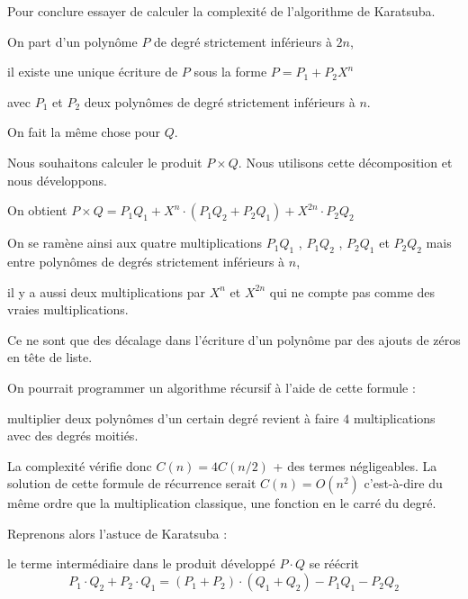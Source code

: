 Pour conclure essayer de calculer la complexité de l'algorithme de Karatsuba.

\diapo


On part d'un polynôme $P$ de degré strictement inférieurs à $2n$,

il existe une unique écriture de $P$ sous la forme $P = P_1 + P_2 X^n $

avec $P_1$ et $P_2$ deux polynômes de degré strictement inférieurs à $n$.

On fait la même chose pour $Q$.

\change

Nous souhaitons calculer le produit $P\times Q$. Nous utilisons cette décomposition  
et nous développons.

\change

On obtient $P\times Q= P_1 Q_1 + X^n \cdot (P_1 Q_2 + P_2 Q_1 ) + X^{2n} \cdot P_2 Q_2$

\change

On se ramène ainsi aux quatre multiplications $P_1 Q_1$ , $P_1 Q_2$ , $P_2 Q_1$ et $P_2 Q_2$ 
mais entre polynômes de degrés strictement inférieurs à $n$,


\change



il y a aussi deux multiplications par $X^n$ et $X^{2n}$ qui ne  compte pas comme des vraies multiplications.

Ce ne sont que des décalage dans l'écriture d'un polynôme par des ajouts de zéros en tête de liste.

\change

On pourrait programmer un algorithme récursif à l'aide de cette formule :

multiplier deux polynômes d'un certain degré revient à faire $4$ multiplications avec des degrés moitiés.

La complexité vérifie donc $C(n) = 4C(n/2)$ + des termes négligeables. La solution de cette formule de récurrence
serait  $C(n) = O(n^2)$ c'est-à-dire du même ordre que la multiplication classique, une fonction en 
le carré du degré.
 
 

\change

Reprenons alors l'astuce de Karatsuba :

\change

le terme intermédiaire dans le produit développé $P \cdot Q$ se réécrit 
$$P_1 \cdot Q_2 + P_2 \cdot Q_1 = (P_1 + P_2 ) \cdot (Q_1 + Q_2 ) - P_1 Q_1 - P_2 Q_2$$

